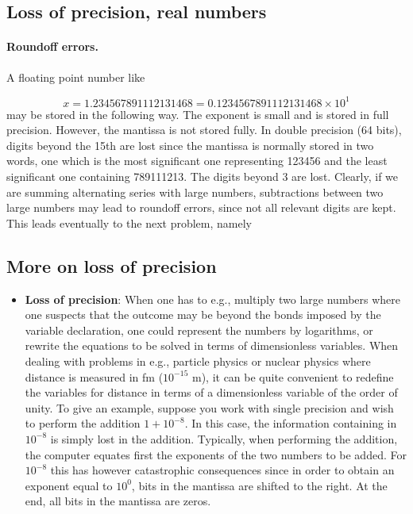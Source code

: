 \documentclass[%
twoside,                 %
final,                   %
10pt]{article}
\newenvironment{block_mdfboxadmon}[1][]{
\begin{block_mdfboxmdframed}[frametitle=#1]
}
{
\end{block_mdfboxmdframed}
}
\begin{document}
\subsection{Loss of precision, real numbers}



\paragraph{Roundoff errors.}
A floating point number like

\begin{equation}
   x= 1.234567891112131468 = 0.1234567891112131468\times 10^{1}
\end{equation}
may be stored in the following way. The exponent is  small
and is stored in full precision. However,
the mantissa is not stored fully. In double precision (64 bits), digits
beyond the
15th are lost since the mantissa is normally stored in two words,
one which is the most significant one representing
123456 and the least significant one containing 789111213. The digits
beyond 3 are lost. Clearly, if we are summing alternating series
with large numbers, subtractions between two large numbers may lead
to roundoff errors, since not all relevant digits are kept.
This leads eventually to the next problem, namely

\subsection{More on loss of precision}


\begin{block_mdfboxadmon}

\begin{itemize}
  \item \textbf{Loss of precision}: When one has to e.g., multiply two large numbers where one suspects that the outcome may be beyond the bonds imposed by the variable declaration, one could represent the numbers by logarithms, or rewrite the equations to be solved in terms of dimensionless variables. When dealing with problems in e.g., particle physics or nuclear physics where distance is measured in fm ($10^{-15}$ m), it can be quite convenient to redefine the variables for distance in terms of a dimensionless variable of the order of unity. To give an example, suppose you work with single precision and wish to perform the addition $1+10^{-8}$. In this case, the information containing in $10^{-8}$ is simply lost in the addition. Typically, when performing the addition, the computer equates first the exponents of the two numbers to be added. For $10^{-8}$ this has however catastrophic consequences since in order to obtain an exponent equal to $10^0$, bits in the mantissa are shifted to the right. At the end, all bits in the mantissa are zeros.
\end{itemize}

\noindent
\end{block_mdfboxadmon}
\end{document}
